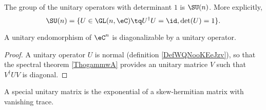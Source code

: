 \begin{definition}        \label{DEFooVIQUooQbnYMu}
	The group of the unitary operators with determinant \( 1\) is \( \SU(n)\). More explicitly,
	\begin{equation}
		\SU(n)=\{U\in \GL(n,\eC)\tq U^{\dag}U=\id,\det(U)=1\}.
	\end{equation}
\end{definition}

\begin{proposition}     \label{PROPooYXPRooBgikdE}
	A unitary endomorphism of \( \eC^n\) is diagonalizable by a unitary operator.
\end{proposition}

\begin{proof}
	A unitary operator \( U\) is normal (definition \ref{DefWQNooKEeJzv}), so that the spectral theorem \ref{ThogammwA} provides an unitary matrice \( V\) such that \( V^{\dag}UV\) is diagonal.
\end{proof}

\begin{proposition}     \label{PROPooZBJSooEIguXR}
	A special unitary matrix is the exponential of a skew-hermitian matrix with vanishing trace.
\end{proposition}

